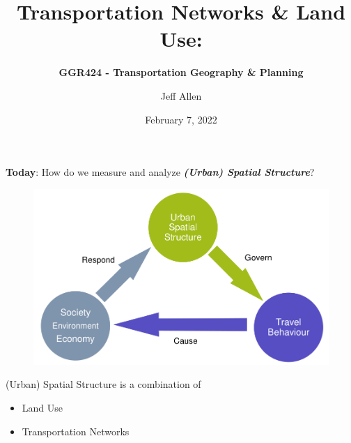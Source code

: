 \documentclass[aspectratio=169]{beamer}
\title{\textbf{Transportation Networks \& Land Use:}}
\subtitle{\textbf{GGR424 - Transportation Geography \& Planning}}
\author{Jeff Allen}
\institute{University of Toronto}
\date{February 7, 2022}
\begin{document}
	
\begin{frame}
	\titlepage	
\end{frame}





\begin{frame}
	
	\textbf{Today}: How do we measure and analyze \textbf{\textit{(Urban) Spatial Structure}}?

	\begin{figure}
		\centering
		\includegraphics[width=0.56\linewidth]{images/big_links.png}
	\end{figure}
	
	(Urban) Spatial Structure is a combination of
	\begin{itemize}
		\item Land Use
		\item Transportation Networks	
	\end{itemize}
	
\end{frame}
\end{document}
